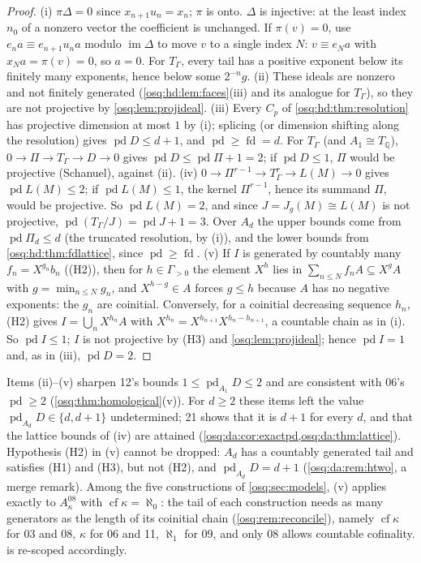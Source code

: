 \documentclass[11pt,letterpaper]{article}
\numberwithin{equation}{section}
\theoremstyle{definition}
\theoremstyle{remark}
\theoremstyle{plain}
\newcommand{\Q}{\mathbb Q}
\newcommand{\pd}{\operatorname{pd}}
\newcommand{\fd}{\operatorname{fd}}
\newcommand{\cf}{\operatorname{cf}}
\begin{document}
\begin{proof}
(i) $\pi\Delta=0$ since $x_{n+1}u_n=x_n$; $\pi$ is onto. $\Delta$ is injective: at the least index $n_0$ of a nonzero vector the
coefficient is unchanged. If $\pi(v)=0$, use $e_na\equiv e_{n+1}u_na$ modulo $\operatorname{im}\Delta$ to move $v$ to a single index
$N$: $v\equiv e_Na$ with $x_Na=\pi(v)=0$, so $a=0$. For $T_\Gamma$, every tail has a positive exponent below its finitely many
exponents, hence below some $2^{-n}g$.
(ii) These ideals are nonzero and not finitely generated (\cref{osq:hd:lem:faces}(iii) and its analogue for $T_\Gamma$), so they
are not projective by \cref{osq:lem:projideal}.
(iii) Every $C_p$ of \cref{osq:hd:thm:resolution} has projective dimension at most $1$ by (i); splicing (or dimension
shifting along the resolution) gives $\pd D\le d+1$, and $\pd\ge\fd=d$. For $T_\Gamma$ (and $A_1\cong T_\Q$), $0\to\Pi\to T_\Gamma\to D\to0$
gives $\pd D\le\pd\Pi+1=2$; if $\pd D\le1$, $\Pi$ would be projective (Schanuel), against (ii).
(iv) $0\to\Pi^{r-1}\to T_\Gamma^r\to L(M)\to0$ gives $\pd L(M)\le2$; if $\pd L(M)\le1$, the kernel $\Pi^{r-1}$, hence its summand $\Pi$,
would be projective. So $\pd L(M)=2$, and since $J=J_g(M)\cong L(M)$ is not projective, $\pd(T_\Gamma/J)=\pd J+1=3$. Over $A_d$ the upper
bounds come from $\pd\Pi_d\le d$ (the truncated resolution, by (i)), and the lower bounds from
\cref{osq:hd:thm:fdlattice}, since $\pd\ge\fd$.
(v) If $I$ is generated by countably many $f_n=X^{g_n}b_n$ ((H2)), then for $h\in\Gamma_{>0}$ the element $X^h$ lies in
$\sum_{n\le N}f_nA\subseteq X^{g}A$ with $g=\min_{n\le N}g_n$, and $X^{h-g}\in A$ forces $g\le h$ because $A$ has no negative
exponents: the $g_n$ are coinitial.
Conversely, for a coinitial decreasing sequence $h_n$, (H2) gives $I=\bigcup_nX^{h_n}A$ with $X^{h_n}=X^{h_{n+1}}X^{h_n-h_{n+1}}$, a
countable chain as in (i). So $\pd I\le1$; $I$ is not projective by (H3) and \cref{osq:lem:projideal}; hence $\pd I=1$ and, as in
(iii), $\pd D=2$.
\end{proof}

Items (ii)--(v) sharpen 12's bounds $1\le\pd_{A_1}D\le2$ and are consistent with 06's $\pd\ge2$ (\cref{osq:thm:homological}(v)). For
$d\ge2$ these items left the value $\pd_{A_d}D\in\{d,d+1\}$ undetermined; 21 shows that it is $d+1$ for every $d$, and that the lattice
bounds of (iv) are attained (\cref{osq:da:cor:exactpd,osq:da:thm:lattice}). Hypothesis (H2) in (v) cannot be dropped: $A_d$ has a countably
generated tail and satisfies (H1) and (H3), but not (H2), and $\pd_{A_d}D=d+1$ (\cref{osq:da:rem:htwo}, a merge remark). Among the five
constructions of \cref{osq:sec:models}, (v) applies
exactly to $A^{08}_\kappa$ with $\cf\kappa=\aleph_0$: the tail of each construction needs as many generators as the length of its
coinitial chain (\cref{osq:rem:reconcile}), namely $\cf\kappa$ for 03 and 08, $\kappa$ for 06 and 11, $\aleph_1$ for 09, and only 08
allows countable cofinality.  is re-scoped accordingly.
\end{document}
